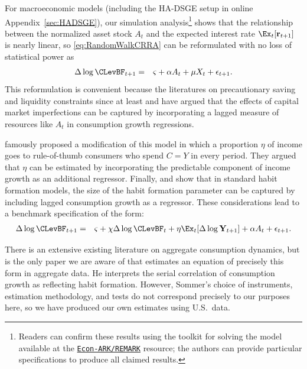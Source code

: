 For macroeconomic models (including the HA-DSGE setup in online Appendix~\ref{sec:HADSGE}), our simulation analysis\footnote{Readers can confirm these results using the toolkit for solving the model available at the \href{https://github.com/econ-ark/REMARK/tree/master/REMARKs/cAndCwithStickyE}{\texttt{Econ-ARK/REMARK}} resource; the authors can provide particular specifications to produce all claimed results.}
shows that the relationship between the normalized asset stock $A_{t}$ and the expected interest rate $\Ex_{t}[\mathbf{r}_{t+1}]$ is nearly linear, so \eqref{eq:RandomWalkCRRA} can be reformulated with no loss of statistical power as
\begin{eqnarray*}
  \label{eq:RandomWalkAForm}
  \Delta \log \CLevBF_{t+1} & = & \varsigma+\alpha A_{t}+\mu X_{t}+\epsilon_{t+1}.
\end{eqnarray*}
This reformulation is convenient because the literatures on precautionary saving and liquidity constraints since at least \cite{zeldes:jpe} and \citeyear{zeldesStochastic} have argued that the effects of capital market imperfections can be captured by incorporating a lagged measure of resources like $A_{t}$ in consumption growth regressions.

\cite{cmModel} famously proposed a modification of this model in which a proportion $\eta$ of income goes to rule-of-thumb consumers who spend $C=Y$ in every period.  They argued that $\eta$ can be estimated by incorporating the predictable component of income growth as an additional regressor.  Finally, \cite{dynanHabits} and \cite{som07} show that in standard habit formation models, the size of the habit formation parameter can be captured by including lagged consumption growth as a regressor.  These considerations lead to a benchmark specification of the form:
\begin{eqnarray}
  \label{eq:CGrowBench}
  \Delta \log \CLevBF_{t+1} & = & \varsigma+\chi \Delta \log \CLevBF_{t}+\eta \Ex_{t}[\Delta \log \mathbf{Y}_{t+1}]+\alpha A_{t}+\epsilon_{t+1}.
\end{eqnarray}

There is an extensive existing literature on aggregate consumption dynamics, but \cite{som07} is the only paper we are aware of that estimates an equation of precisely this form in aggregate data.  He interprets the serial correlation of consumption growth as reflecting habit formation. %
However, Sommer's choice of instruments, estimation methodology, and tests do not correspond precisely to our purposes here, so we have produced our own estimates using U.S.\ data.

